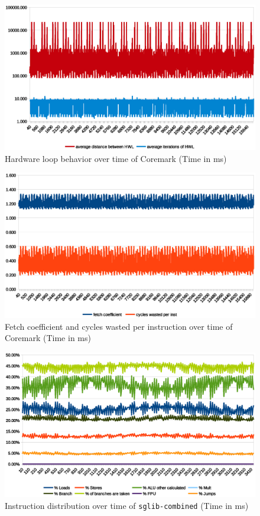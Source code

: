 \documentclass[../bachelor_paper.tex]{subfiles}
\begin{document}
\begin{figure}
    \centering
    \includegraphics[width=\textwidth]{img/graph/coremark/coremark_hwl.eps}
    \caption{Hardware loop behavior over time of Coremark (Time in ms)}
    \label{fig:res/coremark/hwl}
\end{figure}

\begin{figure}
    \centering
    \includegraphics[width=\textwidth]{img/graph/coremark/coremark_fetch_waste.eps}
    \caption{Fetch coefficient and cycles wasted per instruction over time of Coremark (Time in ms)}
    \label{fig:res/coremark/fetch_waste}
\end{figure}

\begin{figure}
    \centering
    \includegraphics[width=\textwidth]{img/graph/embench/sglib-combined_inst.eps}
    \caption{Instruction distribution over time of \texttt{sglib-combined} (Time in ms)}
    \label{fig:res/sglib/inst}
\end{figure}
\end{document}
